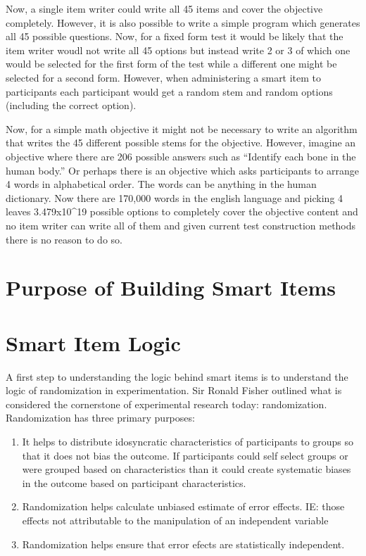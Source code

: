\documentclass[]{book}
\theoremstyle{definition}
\theoremstyle{definition}
\theoremstyle{definition}
\theoremstyle{remark}
\begin{document}
Now, a single item writer could write all 45 items and cover the
objective completely. However, it is also possible to write a simple
program which generates all 45 possible questions. Now, for a fixed form
test it would be likely that the item writer woudl not write all 45
options but instead write 2 or 3 of which one would be selected for the
first form of the test while a different one might be selected for a
second form. However, when administering a smart item to participants
each participant would get a random stem and random options (including
the correct option).

Now, for a simple math objective it might not be necessary to write an
algorithm that writes the 45 different possible stems for the objective.
However, imagine an objective where there are 206 possible answers such
as ``Identify each bone in the human body.'' Or perhaps there is an
objective which asks participants to arrange 4 words in alphabetical
order. The words can be anything in the human dictionary. Now there are
170,000 words in the english language and picking 4 leaves
3.479x10\^{}19 possible options to completely cover the objective
content and no item writer can write all of them and given current test
construction methods there is no reason to do so.

\section{Purpose of Building Smart
Items}\label{purpose-of-building-smart-items}

\section{Smart Item Logic}\label{smart-item-logic}

A first step to understanding the logic behind smart items is to
understand the logic of randomization in experimentation. Sir Ronald
Fisher \citet{fisher1925} outlined what is considered the cornerstone of
experimental research today: randomization. Randomization has three
primary purposes:

\begin{enumerate}
\def\labelenumi{\arabic{enumi})}
\item
  It helps to distribute idosyncratic characteristics of participants to
  groups so that it does not bias the outcome. If participants could
  self select groups or were grouped based on characteristics than it
  could create systematic biases in the outcome based on participant
  characteristics.
\item
  Randomization helps calculate unbiased estimate of error effects. IE:
  those effects not attributable to the manipulation of an independent
  variable
\item
  Randomization helps ensure that error efects are statistically
  independent.
\end{enumerate}
\end{document}
